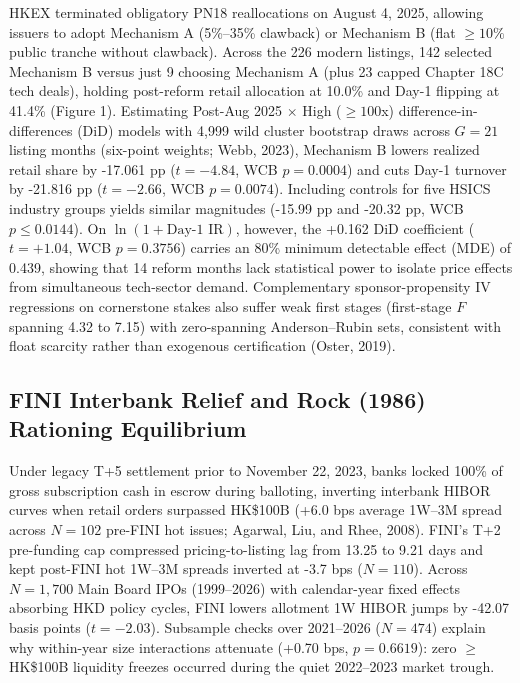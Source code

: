 \documentclass[12pt,letterpaper]{article}
\begin{document}
HKEX terminated obligatory PN18 reallocations on August 4, 2025, allowing issuers to adopt Mechanism A (5\%--35\% clawback) or Mechanism B (flat $\ge 10\%$ public tranche without clawback). Across the 226 modern listings, 142 selected Mechanism B versus just 9 choosing Mechanism A (plus 23 capped Chapter 18C tech deals), holding post-reform retail allocation at 10.0\% and Day-1 flipping at 41.4\% (Figure 1). Estimating Post-Aug 2025 $\times$ High ($\ge 100$x) difference-in-differences (DiD) models with 4,999 wild cluster bootstrap draws across $G = 21$ listing months (six-point weights; Webb, 2023), Mechanism B lowers realized retail share by -17.061 pp ($t = -4.84$, WCB $p = 0.0004$) and cuts Day-1 turnover by -21.816 pp ($t = -2.66$, WCB $p = 0.0074$). Including controls for five HSICS industry groups yields similar magnitudes (-15.99 pp and -20.32 pp, WCB $p \le 0.0144$). On $\ln(1 + \text{Day-1 IR})$, however, the +0.162 DiD coefficient ($t = +1.04$, WCB $p = 0.3756$) carries an 80\% minimum detectable effect (MDE) of 0.439, showing that 14 reform months lack statistical power to isolate price effects from simultaneous tech-sector demand. Complementary sponsor-propensity IV regressions on cornerstone stakes also suffer weak first stages (first-stage $F$ spanning 4.32 to 7.15) with zero-spanning Anderson--Rubin sets, consistent with float scarcity rather than exogenous certification (Oster, 2019).

\subsection{FINI Interbank Relief and Rock (1986) Rationing Equilibrium}

Under legacy T+5 settlement prior to November 22, 2023, banks locked 100\% of gross subscription cash in escrow during balloting, inverting interbank HIBOR curves when retail orders surpassed HK\$100B (+6.0 bps average 1W--3M spread across $N = 102$ pre-FINI hot issues; Agarwal, Liu, and Rhee, 2008). FINI's T+2 pre-funding cap compressed pricing-to-listing lag from 13.25 to 9.21 days and kept post-FINI hot 1W--3M spreads inverted at -3.7 bps ($N = 110$). Across $N = 1,700$ Main Board IPOs (1999--2026) with calendar-year fixed effects absorbing HKD policy cycles, FINI lowers allotment 1W HIBOR jumps by -42.07 basis points ($t = -2.03$). Subsample checks over 2021--2026 ($N = 474$) explain why within-year size interactions attenuate (+0.70 bps, $p = 0.6619$): zero $\ge$ HK\$100B liquidity freezes occurred during the quiet 2022--2023 market trough.
\end{document}
